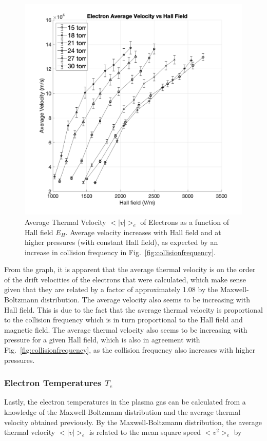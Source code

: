 \documentclass[%
 aip,
rsi,%
 amsmath,amssymb,
 reprint,%
author-numerical,%
]{revtex4-1}
\begin{document}
\begin{figure}
\includegraphics[width=1\linewidth]{lateximages/averagevelocity.png} 
\caption{\label{fig:averagevelocity} Average Thermal Velocity $ < | v | > _ { e }$ of Electrons as a function of Hall field ${E}  _ { H }$. Average velocity increases with Hall field and at higher pressures (with constant Hall field), as expected by an increase in collision frequency in Fig.~\ref{fig:collisionfrequency}.}
\end{figure}

\indent From the graph, it is apparent that the average thermal velocity is on the order of the drift velocities of the electrons that were calculated, which make sense given that they are related by a factor of approximately 1.08 by the Maxwell-Boltzmann distribution. The average velocity also seems to be increasing with Hall field. This is due to the fact that the average thermal velocity is proportional to the collision frequency which is in turn proportional to the Hall field and magnetic field. The average thermal velocity also seems to be increasing with pressure for a given Hall field, which is also in agreement with Fig.~\ref{fig:collisionfrequency}, as the collision frequency also increases with higher pressures.


\subsubsection{Electron Temperatures $T_{e}$}
Lastly, the electron temperatures in the plasma gas can be calculated from a knowledge of the Maxwell-Boltzmann distribution and the average thermal velocity obtained previously. By the Maxwell-Boltzmann distribution, the average thermal velocity $< | v | > _ { e }$ is related to the mean square speed $<  v^2  > _ { e }$ by 
\end{document}
